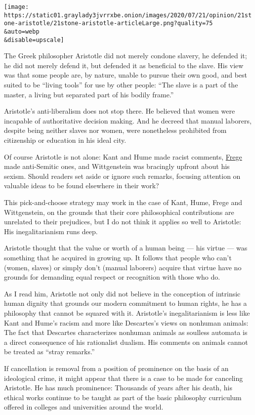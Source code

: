 \texttt{[image: https://static01.graylady3jvrrxbe.onion/images/2020/07/21/opinion/21stone-aristotle/21stone-aristotle-articleLarge.png?quality=75\\\&auto=webp\\\&disable=upscale]}

The Greek philosopher Aristotle did not merely condone slavery, he
defended it; he did not merely defend it, but defended it as beneficial
to the slave. His view was that some people are, by nature, unable to
pursue their own good, and best suited to be ``living tools'' for use by
other people: ``The slave is a part of the master, a living but
separated part of his bodily frame.''

Aristotle's anti-liberalism does not stop there. He believed that women
were incapable of authoritative decision making. And he decreed that
manual laborers, despite being neither slaves nor women, were
nonetheless prohibited from citizenship or education in his ideal city.

Of course Aristotle is not alone: Kant and Hume made racist comments,
\href{https://plato.stanford.edu/entries/frege/}{Frege} made
anti-Semitic ones, and Wittgenstein was bracingly upfront about his
sexism. Should readers set aside or ignore such remarks, focusing
attention on valuable ideas to be found elsewhere in their work?

This pick-and-choose strategy may work in the case of Kant, Hume, Frege
and Wittgenstein, on the grounds that their core philosophical
contributions are unrelated to their prejudices, but I do not think it
applies so well to Aristotle: His inegalitarianism runs deep.

Aristotle thought that the value or worth of a human being --- his
virtue --- was something that he acquired in growing up. It follows that
people who can't (women, slaves) or simply don't (manual laborers)
acquire that virtue have no grounds for demanding equal respect or
recognition with those who do.

As I read him, Aristotle not only did not believe in the conception of
intrinsic human dignity that grounds our modern commitment to human
rights, he has a philosophy that cannot be squared with it. Aristotle's
inegalitarianism is less like Kant and Hume's racism and more like
Descartes's views on nonhuman animals: The fact that Descartes
characterizes nonhuman animals as soulless automata is a direct
consequence of his rationalist dualism. His comments on animals cannot
be treated as ``stray remarks.''

If cancellation is removal from a position of prominence on the basis of
an ideological crime, it might appear that there is a case to be made
for canceling Aristotle. He has much prominence: Thousands of years
after his death, his ethical works continue to be taught as part of the
basic philosophy curriculum offered in colleges and universities around
the world.

